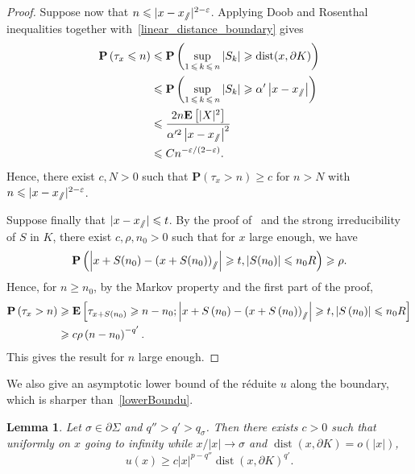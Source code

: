 \documentclass[10pt]{amsart}
\newtheorem{lemm}[theo]{Lemma}\newtheorem{prop}[theo]{Proposition}\newtheorem{coro}[theo]{Corollary}\newtheorem{conj}[theo]{Conjecture}
\theoremstyle{definition}\newtheorem{defi}[theo]{Definition}\newtheorem{rema}[theo]{Remark}\newtheorem{exam}[theo]{Example}\newtheorem{exem}[theo]{Example}\newtheorem{nota}[theo]{Notation}
\DeclareMathOperator{\dist}{dist}
\newcommand{\pr}{\mathbf{P}}
\newcommand{\e}{\mathbf{E}}
\renewcommand{\epsilon}{\varepsilon}
\renewcommand{\leq}{\leqslant}
\renewcommand{\geq}{\geqslant}
\newcommand{\sslash}{\slash\mkern-6.4mu\slash}
\begin{document}
\begin{proof}
Suppose now that $n\leq | x-x_{\sslash}|^{2-\epsilon}$. Applying Doob and Rosenthal inequalities together with~\eqref{linear_distance_boundary} gives
\begin{align*}
\pr\left(\tau_{x}\leq n\right)&\leq \pr\left(\sup_{1\,\leq\,k\,\leq\,n} |S_{k}|\geq \dist(x,\partial K)\right)\\
&\leq \pr\left(\sup_{1\,\leq\,k\,\leq\,n} |S_{k}|\geq \alpha'\left|x-x_{\sslash}\right|\right)\\
&\leq \frac{2n\e\left[|X|^{2}\right]}{\alpha'^{2}\left|x-x_{\sslash}\right|^{2}}\\
&\leq Cn^{-\epsilon/(2-\epsilon)}.
\end{align*}
Hence, there exist $c,N>0$ such that $\pr(\tau_{x}> n)\geq c$ for $n>N$ with $n\leq| x-x_{\sslash}|^{2-\epsilon}$.

Suppose finally that $|x-x_{\sslash}|\leq t$. By the proof of~\cite[Lemma~14]{DeWa-15} and the strong irreducibility of $S$ in $K$, there exist $c,\rho,n_{0}>0$ such that for $x$ large enough, we have
\[
\pr\left(\left| x+S(n_{0})-\left(x+S(n_{0})\right)_{\sslash}\right|\geq t, \left|S(n_{0})\right|\leq n_{0}R\right)\geq \rho.
\]
Hence, for $n\geq n_{0}$, by the Markov property and the first part of the proof,
\begin{align*}
\pr\left(\tau_{x}>n\right)&\geq \e\left[\tau_{x+S(n_{0})}\geq n-n_{0};\left| x+S\left(n_{0}\right)-\left(x+S\left(n_{0}\right)\right)_{\sslash}\right|\geq t, \left| S\left(n_{0}\right)\right|\leq n_{0}R\right]\\
&\geq c\rho \left(n-n_{0}\right)^{-q'}.
\end{align*}
This gives the result for $n$ large enough.
\end{proof}

We also give an asymptotic lower bound of the réduite $u$ along the boundary, which is sharper than~\eqref{lowerBoundu}.

\begin{lemm}\label{lower_bound_u_tangent}
Let $\sigma\in \partial \Sigma$ and $q''>q'>q_{\sigma}$. Then there exists $c>0$ such that uniformly on $x$ going to infinity while $x/| x|\rightarrow \sigma$ and $\dist(x,\partial K)=o(| x|)$,
\[
u(x)\geq c|x|^{p-q''}\dist(x,\partial K)^{q'}.
\]
\end{lemm}
\end{document}
